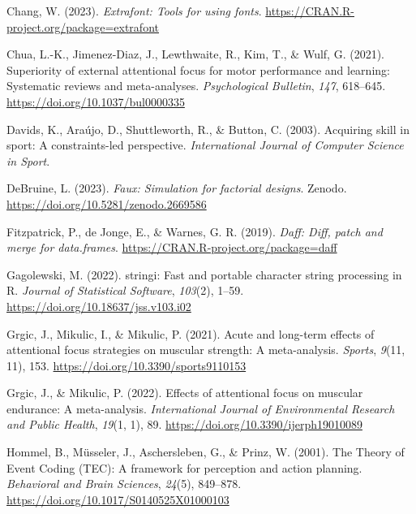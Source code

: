 \documentclass[
  11pt,
  doc, donotrepeattitle,floatsintext]{apa7}
\newlength{\cslhangindent}
\newlength{\cslentryspacingunit} %
\newenvironment{CSLReferences}[2] %
 {%
  \setlength{\parindent}{0pt}
  \ifodd #1
  \let\oldpar\par
  \def\par{\hangindent=\cslhangindent\oldpar}
  \fi
  \setlength{\parskip}{#2\cslentryspacingunit}
 }%
 {}
\begin{document}
\begin{CSLReferences}{1}{0}
\leavevmode{}%
Chang, W. (2023). \emph{Extrafont: Tools for using fonts}. \url{https://CRAN.R-project.org/package=extrafont}

\leavevmode{}%
Chua, L.-K., Jimenez-Diaz, J., Lewthwaite, R., Kim, T., \& Wulf, G. (2021). Superiority of external attentional focus for motor performance and learning: {Systematic} reviews and meta-analyses. \emph{Psychological Bulletin}, \emph{147}, 618--645. \url{https://doi.org/10.1037/bul0000335}

\leavevmode{}%
Davids, K., Araújo, D., Shuttleworth, R., \& Button, C. (2003). Acquiring skill in sport: {A} constraints-led perspective. \emph{International Journal of Computer Science in Sport}.

\leavevmode{}%
DeBruine, L. (2023). \emph{Faux: Simulation for factorial designs}. Zenodo. \url{https://doi.org/10.5281/zenodo.2669586}

\leavevmode{}%
Fitzpatrick, P., de Jonge, E., \& Warnes, G. R. (2019). \emph{Daff: Diff, patch and merge for data.frames}. \url{https://CRAN.R-project.org/package=daff}

\leavevmode{}%
Gagolewski, M. (2022). {stringi}: {F}ast and portable character string processing in {R}. \emph{Journal of Statistical Software}, \emph{103}(2), 1--59. \url{https://doi.org/10.18637/jss.v103.i02}

\leavevmode{}%
Grgic, J., Mikulic, I., \& Mikulic, P. (2021). Acute and long-term effects of attentional focus strategies on muscular strength: {A} meta-analysis. \emph{Sports}, \emph{9}(11, 11), 153. \url{https://doi.org/10.3390/sports9110153}

\leavevmode{}%
Grgic, J., \& Mikulic, P. (2022). Effects of attentional focus on muscular endurance: {A} meta-analysis. \emph{International Journal of Environmental Research and Public Health}, \emph{19}(1, 1), 89. \url{https://doi.org/10.3390/ijerph19010089}

\leavevmode{}%
Hommel, B., Müsseler, J., Aschersleben, G., \& Prinz, W. (2001). The {Theory} of {Event Coding} ({TEC}): {A} framework for perception and action planning. \emph{Behavioral and Brain Sciences}, \emph{24}(5), 849--878. \url{https://doi.org/10.1017/S0140525X01000103}


\end{CSLReferences}
\end{document}
